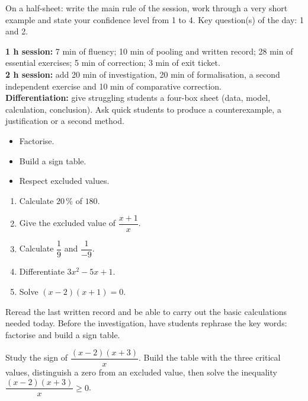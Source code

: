 \begin{sortie}On a half-sheet: write the main rule of the session, work through a very short example and state your confidence level from 1 to 4. Key question(s) of the day: 1 and 2.\end{sortie}

\ifprof
\begin{methode}
\textbf{1 h session:} 7 min of fluency; 10 min of pooling and written record; 28 min of essential exercises; 5 min of correction; 3 min of exit ticket.\\
\textbf{2 h session:} add 20 min of investigation, 20 min of formalisation, a second independent exercise and 10 min of comparative correction.\\
\textbf{Differentiation:} give struggling students a four-box sheet (data, model, calculation, conclusion). Ask quick students to produce a counterexample, a justification or a second method.
\end{methode}
\fi
{}
\begin{objectifs}\begin{itemize}\item Factorise.\item Build a sign table.\item Respect excluded values.\end{itemize}\end{objectifs}
\begin{automatismes}\begin{enumerate}\item Calculate $20\,\%$ of $180$. \item Give the excluded value of $\dfrac{x+1}{x}$. \item Calculate $\dfrac1{9}$ and $\dfrac1{-9}$. \item Differentiate $3x^2-5x+1$. \item Solve $(x-2)(x+1)=0$. \end{enumerate}\end{automatismes}
\begin{prerequis}Reread the last written record and be able to carry out the basic calculations needed today. Before the investigation, have students rephrase the key words: factorise and build a sign table.\end{prerequis}

\begin{activite}
Study the sign of $\dfrac{(x-2)(x+3)}x$. Build the table with the three critical values, distinguish a zero from an excluded value, then solve the inequality $\dfrac{(x-2)(x+3)}x\geq0$.

\end{activite}
\enseignant{The critical values are $-3,0,2$. The solution is $[-3,0[\cup[2,+\infty[$. Have students say aloud which piece of data triggers the choice of method.}

